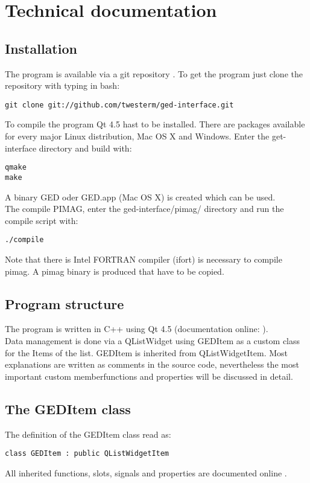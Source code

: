 \section{Technical documentation}\label{tech}
\subsection{Installation}
The program is available via a git repository \cite{git}. To get the program just clone the repository with typing in bash: 
\begin{lstlisting}
git clone git://github.com/twesterm/ged-interface.git
\end{lstlisting}
To compile the program Qt 4.5 \cite{qt} hast to be installed. There are packages available for every major Linux distribution, Mac OS X and Windows. Enter the get-interface directory and build with: 
\begin{lstlisting}
qmake
make
\end{lstlisting}
A binary GED oder GED.app (Mac OS X) is created which can be used. \\
The compile PIMAG, enter the ged-interface/pimag/ directory and run the compile script with: 
\begin{lstlisting}
./compile
\end{lstlisting}
Note that there is Intel FORTRAN compiler (ifort) \cite{ifort}  is necessary to compile pimag. A pimag binary is produced that have to be copied. 

\subsection{Program structure}
The program is written in C++ using Qt 4.5 (documentation online: \cite{qtdoc}).\\
 Data management is done via a QListWidget using GEDItem as a custom class for the Items of the list. GEDItem is inherited from QListWidgetItem. Most explanations are written as comments in the source code, nevertheless the most important custom memberfunctions and properties will be discussed in detail. \\
 
 
\subsection{The GEDItem class}
The definition of the GEDItem class read as: 
\begin{lstlisting}
class GEDItem : public QListWidgetItem
\end{lstlisting}
All inherited functions, slots, signals and properties are documented online \cite{qtdoc}.     \\

